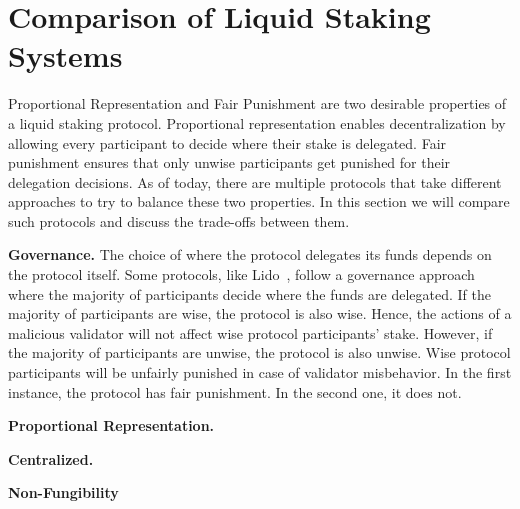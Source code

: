 \section{Comparison of Liquid Staking Systems}

Proportional Representation and Fair Punishment are two desirable
properties of a liquid staking protocol.
Proportional representation enables decentralization by allowing every
participant to decide where their stake is delegated.
Fair punishment ensures that only unwise participants get punished for
their delegation decisions.
As of today, there are multiple protocols that take different approaches
to try to balance these two properties. In this section we will
compare such protocols and discuss the trade-offs between them.

\textbf{Governance.}
The choice of where the protocol delegates its funds depends on the
protocol itself. Some protocols, like Lido~\cite{lido}, follow a governance approach
where the majority of participants decide where the funds are
delegated. If the majority of participants are
wise, the protocol is also wise. Hence, the actions of a malicious validator
will not affect wise protocol participants' stake.
However, if the majority of participants are unwise, the protocol is
also unwise. Wise protocol participants will be unfairly punished in case
of validator misbehavior.
In the first instance, the protocol has fair punishment. In the
second one, it does not.


\textbf{Proportional Representation.}


\textbf{Centralized.}

\textbf{Non-Fungibility}

